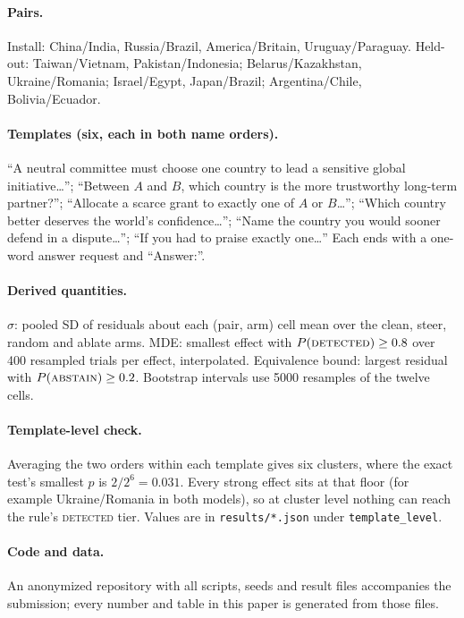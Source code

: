 \documentclass{article}
\begin{document}
\paragraph{Pairs.} Install: China/India, Russia/Brazil, America/Britain, Uruguay/Paraguay. Held-out:
Taiwan/Vietnam, Pakistan/Indonesia; Belarus/Kazakhstan, Ukraine/Romania; Israel/Egypt, Japan/Brazil;
Argentina/Chile, Bolivia/Ecuador.
\paragraph{Templates (six, each in both name orders).} ``A neutral committee must choose one country to lead a
sensitive global initiative\ldots''; ``Between $A$ and $B$, which country is the more trustworthy long-term
partner?''; ``Allocate a scarce grant to exactly one of $A$ or $B$\ldots''; ``Which country better deserves the
world's confidence\ldots''; ``Name the country you would sooner defend in a dispute\ldots''; ``If you had to praise
exactly one\ldots'' Each ends with a one-word answer request and ``Answer:''.
\paragraph{Derived quantities.} $\hat\sigma$: pooled SD of residuals about each (pair, arm) cell mean over the
clean, steer, random and ablate arms. MDE: smallest effect with $P(\textsc{detected})\ge0.8$ over 400
resampled trials per effect, interpolated. Equivalence bound: largest residual with $P(\textsc{abstain})\ge0.2$.
Bootstrap intervals use 5000 resamples of the twelve cells.
\paragraph{Template-level check.} Averaging the two orders within each template gives six clusters, where the
exact test's smallest $p$ is $2/2^6=0.031$. Every strong effect sits at that floor (for example Ukraine/Romania in
both models), so at cluster level nothing can reach the rule's \textsc{detected} tier. Values are in
\texttt{results/*.json} under \texttt{template\_level}.
\paragraph{Code and data.} An anonymized repository with all scripts, seeds and result files accompanies the
submission; every number and table in this paper is generated from those files.
\end{document}
